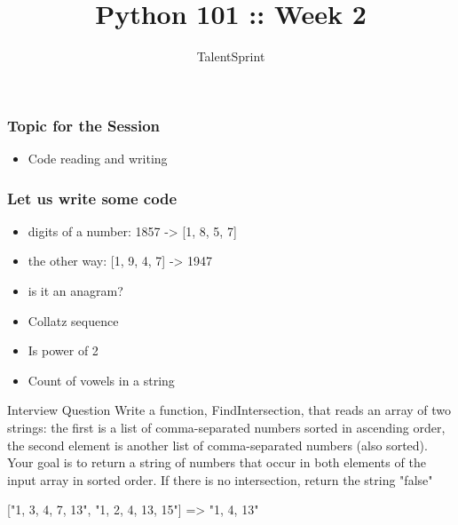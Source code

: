 \documentclass[14pt]{beamer}
\title{Python 101 :: Week 2}
\date{}
\author[TS]{TalentSprint}
\begin{document}
    \begin{frame}
        \titlepage
    \end{frame}
    \begin{frame}
	\frametitle{Topic for the Session}
	\begin{itemize}
		\item Code reading and writing
	\end{itemize}
    \end{frame}
    \begin{frame}
	\frametitle{Let us write some code}
	 \begin{itemize}
  	     \item digits of a number: 1857 -> [1, 8, 5, 7]
    	     \pause
	     \item the other way: [1, 9, 4, 7] -> 1947
             \pause
             \item is it an anagram?
             \pause
             \item Collatz sequence
             \pause
  	     \item Is power of 2
	     \pause
	     \item Count of vowels in a string
         \end{itemize}
    \end{frame}
    \begin{frame}{Interview Question}
	\small
Write a function, FindIntersection, that reads an array of two strings: the first is a list of comma-separated numbers sorted in ascending order, the second element is another list of comma-separated numbers (also sorted). Your goal is to return a string of numbers that occur in both elements of the input array in sorted order. If there is no intersection, return the string "false"

["1, 3, 4, 7, 13", "1, 2, 4, 13, 15"]  => "1, 4, 13"
    \end{frame}
\end{document}
